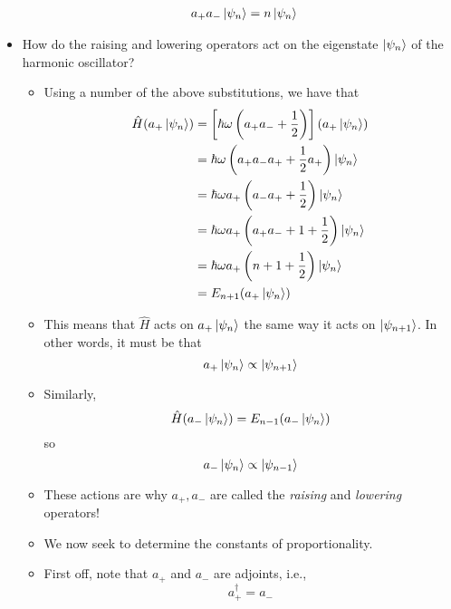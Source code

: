 \documentclass[../notes.tex]{subfiles}
\begin{document}
\begin{itemize}
\begin{itemize}
\begin{align*}
            a_+a_-\ket{\psi_n} &= n\ket{\psi_n}
        \end{align*}
    \end{itemize}
    \item How do the raising and lowering operators act on the eigenstate $\ket{\psi_n}$ of the harmonic oscillator?
    \begin{itemize}
        \item Using a number of the above substitutions, we have that
        \begin{align*}
            \hat{H}(a_+\ket{\psi_n}) &= \left[ \hbar\omega\left( a_+a_-+\frac{1}{2} \right) \right](a_+\ket{\psi_n})\\
            &= \hbar\omega\left( a_+a_-a_++\frac{1}{2}a_+ \right)\ket{\psi_n}\\
            &= \hbar\omega a_+\left( a_-a_++\frac{1}{2} \right)\ket{\psi_n}\\
            &= \hbar\omega a_+\left( a_+a_-+1+\frac{1}{2} \right)\ket{\psi_n}\\
            &= \hbar\omega a_+\left( n+1+\frac{1}{2} \right)\ket{\psi_n}\\
            &= E_{n+1}(a_+\ket{\psi_n})
        \end{align*}
        \item This means that $\hat{H}$ acts on $a_+\ket{\psi_n}$ the same way it acts on $\ket{\psi_{n+1}}$. In other words, it must be that
        \begin{equation*}
            a_+\ket{\psi_n} \propto \ket{\psi_{n+1}}
        \end{equation*}
        \item Similarly,
        \begin{equation*}
            \hat{H}(a_-\ket{\psi_n}) = E_{n-1}(a_-\ket{\psi_n})
        \end{equation*}
        so
        \begin{equation*}
            a_-\ket{\psi_n} \propto \ket{\psi_{n-1}}
        \end{equation*}
        \item These actions are why $a_+,a_-$ are called the \emph{raising} and \emph{lowering} operators!
        \item We now seek to determine the constants of proportionality.
        \item First off, note that $a_+$ and $a_-$ are adjoints, i.e.,
        \begin{equation*}
            a_+^\dagger = a_-
        \end{equation*}

\end{itemize}
\end{itemize}
\end{document}
